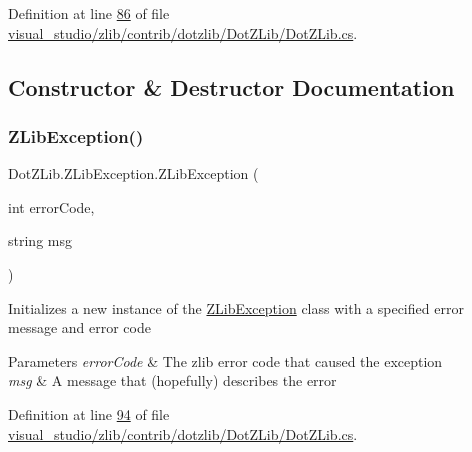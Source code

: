 Definition at line \hyperlink{visual__studio_2zlib_2contrib_2dotzlib_2_dot_z_lib_2_dot_z_lib_8cs_source_l00086}{86} of file \hyperlink{visual__studio_2zlib_2contrib_2dotzlib_2_dot_z_lib_2_dot_z_lib_8cs_source}{visual\+\_\+studio/zlib/contrib/dotzlib/\+Dot\+Z\+Lib/\+Dot\+Z\+Lib.\+cs}.



\subsection{Constructor \& Destructor Documentation}
\mbox{\label{class_dot_z_lib_1_1_z_lib_exception_a6a413e419130b98ef8a443a74b2f8ded}} 
\subsubsection{\texorpdfstring{Z\+Lib\+Exception()}{ZLibException()}\hspace{0.1cm}{\footnotesize\ttfamily [1/4]}}
{\footnotesize\ttfamily Dot\+Z\+Lib.\+Z\+Lib\+Exception.\+Z\+Lib\+Exception (\begin{DoxyParamCaption}\item[{int}]{error\+Code,  }\item[{string}]{msg }\end{DoxyParamCaption})\hspace{0.3cm}{\ttfamily [inline]}}



Initializes a new instance of the \hyperlink{class_dot_z_lib_1_1_z_lib_exception}{Z\+Lib\+Exception} class with a specified error message and error code 


\begin{DoxyParams}{Parameters}
{\em error\+Code} & The zlib error code that caused the exception\\
\hline
{\em msg} & A message that (hopefully) describes the error\\
\hline
\end{DoxyParams}


Definition at line \hyperlink{visual__studio_2zlib_2contrib_2dotzlib_2_dot_z_lib_2_dot_z_lib_8cs_source_l00094}{94} of file \hyperlink{visual__studio_2zlib_2contrib_2dotzlib_2_dot_z_lib_2_dot_z_lib_8cs_source}{visual\+\_\+studio/zlib/contrib/dotzlib/\+Dot\+Z\+Lib/\+Dot\+Z\+Lib.\+cs}.


